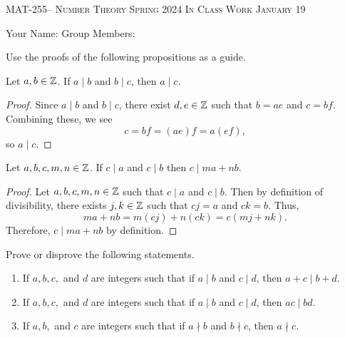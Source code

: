 \documentclass[handout]{ximera}
\date{January 19, 2024}
\begin{document}
\handoutAbstract
\maketitle
  \begin{center}%
    {\large \scshape MAT-255-- Number Theory \hfill Spring 2024 \hfill In Class Work January 19}%
    
    {\large
        Your Name: \hrulefill \quad 
        Group Members:\hrulefill \quad \hrulefill
        \par}%
  \end{center}%

Use the proofs of the following propositions as a guide.

\begin{proposition}%
    Let $a,b\in\mathbb Z$. If $a\mid b$ and $b \mid c$, then $a\mid c$.
    \begin{proof}
        Since $a\mid b$ and $b \mid c$, there exist $d,e\in\mathbb Z$ such that $b=ae$ and $c=bf$. Combining these, we see \[c=bf=(ae)f=a(ef),\] so $a\mid c$.
    \end{proof}
\end{proposition}



\begin{proposition}%
    Let $a,b,c,m,n\in\mathbb Z$.
    If $c\mid a$ and $c\mid b$ then $c\mid ma+nb$.

    \begin{proof}
        Let $a,b,c,m,n\in\mathbb Z$ such that $c\mid a$ and $c\mid b$. Then by definition of divisibility, there exists $j,k\in\mathbb Z$ such that $cj=a$ and $ck=b$. Thus, \[ma+nb=m(cj)+n(ck)=c(mj+nk).\] Therefore, $c\mid ma+nb$ by definition.
    \end{proof}
\end{proposition}

\begin{br}%
    Prove or disprove the following statements.
    \begin{enumerate}
        \item If $a,b,c,$ and $d$ are integers such that if $a\mid b$ and $c\mid d$, then $a+c\mid b+d$.
        \item If $a,b,c,$ and $d$ are integers such that if $a\mid b$ and $c\mid d$, then $ac\mid bd$.
        \item If $a,b,$ and $c$ are integers such that if $a\nmid b$ and $b\nmid c$, then $a\nmid c$.
    \end{enumerate}
\end{br}
\end{document}
